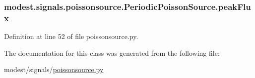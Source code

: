 \subsubsection[{\texorpdfstring{peak\+Flux}{peakFlux}}]{\setlength{\rightskip}{0pt plus 5cm}modest.\+signals.\+poissonsource.\+Periodic\+Poisson\+Source.\+peak\+Flux}\hypertarget{classmodest_1_1signals_1_1poissonsource_1_1PeriodicPoissonSource_af88d243e09713ecde60baa40edfedc0b}{}\label{classmodest_1_1signals_1_1poissonsource_1_1PeriodicPoissonSource_af88d243e09713ecde60baa40edfedc0b}


Definition at line 52 of file poissonsource.\+py.



The documentation for this class was generated from the following file\+:\begin{DoxyCompactItemize}
\item 
modest/signals/\hyperlink{poissonsource_8py}{poissonsource.\+py}\end{DoxyCompactItemize}
